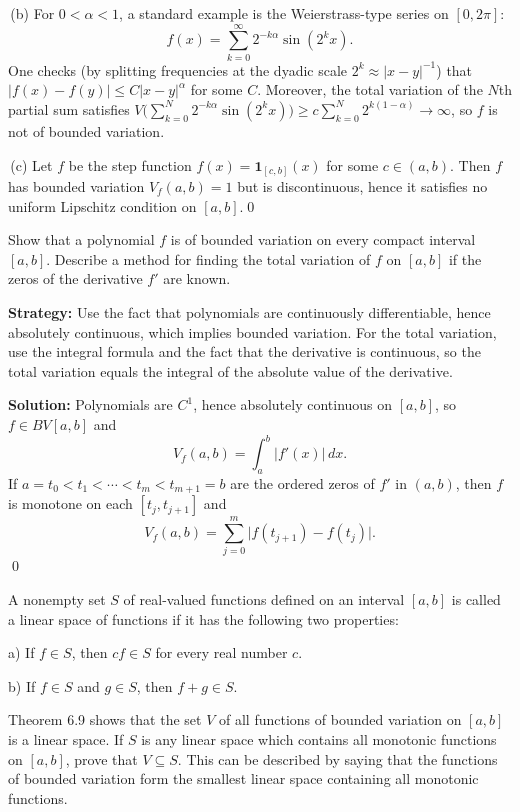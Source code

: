 \,(b) For $0<\alpha<1$, a standard example is the Weierstrass-type series on $[0,2\pi]$:
\[f(x)=\sum_{k=0}^{\infty}2^{-k\alpha}\sin(2^k x).\]
One checks (by splitting frequencies at the dyadic scale $2^k\approx |x-y|^{-1}$) that $|f(x)-f(y)|\le C|x-y|^{\alpha}$ for some $C$. Moreover, the total variation of the $N$th partial sum satisfies $V\big(\sum_{k=0}^N2^{-k\alpha}\sin(2^k x)\big)\ge c\sum_{k=0}^N2^{k(1-\alpha)}\to\infty$, so $f$ is not of bounded variation.

\,(c) Let $f$ be the step function $f(x)=\mathbf{1}_{[c,b]}(x)$ for some $c\in(a,b)$. Then $f$ has bounded variation $V_f(a,b)=1$ but is discontinuous, hence it satisfies no uniform Lipschitz condition on $[a,b]$.\qed


\begin{problembox}
\begin{problemstatement}
Show that a polynomial $f$ is of bounded variation on every compact interval $[a, b]$. Describe a method for finding the total variation of $f$ on $[a, b]$ if the zeros of the derivative $f'$ are known.
\end{problemstatement}
\end{problembox}

\noindent\textbf{Strategy:} Use the fact that polynomials are continuously differentiable, hence absolutely continuous, which implies bounded variation. For the total variation, use the integral formula and the fact that the derivative is continuous, so the total variation equals the integral of the absolute value of the derivative.

\bigskip\noindent\textbf{Solution:}
Polynomials are $C^1$, hence absolutely continuous on $[a,b]$, so $f\in BV[a,b]$ and
\[V_f(a,b)=\int_a^b |f'(x)|\,dx.\]
If $a=t_0<t_1<\cdots<t_m<t_{m+1}=b$ are the ordered zeros of $f'$ in $(a,b)$, then $f$ is monotone on each $[t_j,t_{j+1}]$ and
\[V_f(a,b)=\sum_{j=0}^{m}\big|f(t_{j+1})-f(t_j)\big|.\]\qed


\begin{problembox}
\begin{problemstatement}
A nonempty set $S$ of real-valued functions defined on an interval $[a, b]$ is called a linear space of functions if it has the following two properties:

a) If $f \in S$, then $cf \in S$ for every real number $c$.

b) If $f \in S$ and $g \in S$, then $f + g \in S$.

Theorem 6.9 shows that the set $V$ of all functions of bounded variation on $[a, b]$ is a linear space. If $S$ is any linear space which contains all monotonic functions on $[a, b]$, prove that $V \subseteq S$. This can be described by saying that the functions of bounded variation form the smallest linear space containing all monotonic functions.
\end{problemstatement}
\end{problembox}

